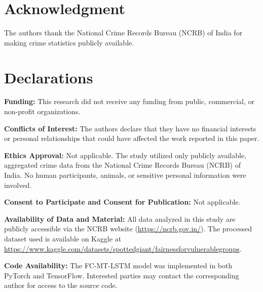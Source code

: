 \documentclass[conference]{IEEEtran}
\begin{document}
\section*{Acknowledgment}
The authors thank the National Crime Records Bureau (NCRB) of India for making crime statistics publicly available.

\section*{Declarations}
\noindent\textbf{Funding:} This research did not receive any funding from public, commercial, or non-profit organizations.

\noindent\textbf{Conflicts of Interest:} The authors declare that they have no financial interests or personal relationships that could have affected the work reported in this paper.

\noindent\textbf{Ethics Approval:} Not applicable. The study utilized only publicly available, aggregated crime data from the National Crime Records Bureau (NCRB) of India. No human participants, animals, or sensitive personal information were involved.

\noindent\textbf{Consent to Participate and Consent for Publication:} Not applicable.

\noindent\textbf{Availability of Data and Material:} All data analyzed in this study are publicly accessible via the NCRB website (\url{https://ncrb.gov.in/}). The processed dataset used is available on Kaggle at \url{https://www.kaggle.com/datasets/spottedgiant/fairnessforvulnerablegroups}.

\noindent\textbf{Code Availability:} The FC-MT-LSTM model was implemented in both PyTorch and TensorFlow. Interested parties may contact the corresponding author for access to the source code.
\end{document}
